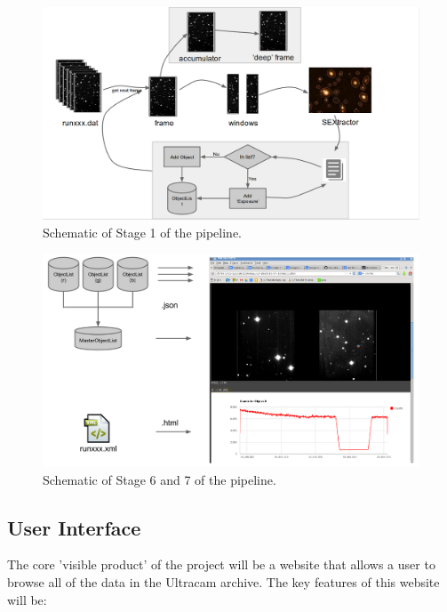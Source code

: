 \documentclass[a4paper,10pt]{article}
\begin{document}
\begin{enumerate}
\end{enumerate}

\begin{figure}[!h]
	\centering
	\includegraphics[width=130mm]{images/flowchart.png}
	\caption{Schematic of Stage 1 of the pipeline.}
	\label{flowchart}
\end{figure}


\begin{figure}[!h]
	\centering
	\includegraphics[width=130mm]{images/webpublish.png}
	\caption{Schematic of Stage 6 and 7 of the pipeline.}
	\label{webpublish}
\end{figure}



\subsection{User Interface}
The core 'visible product' of the project will be a website that allows a user to browse all of the data in the Ultracam archive. The key features of this website will be:
\end{document}

